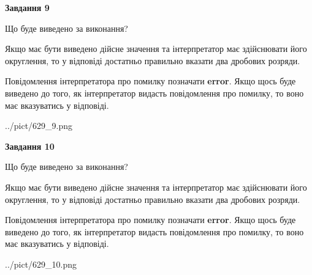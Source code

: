 \documentclass[12pt, ukrainian]{article}
\begin{document}
{\begin {Large}
{\begin {center}\textbf{Завдання 9}\end {center}}\par
Що буде виведено за виконання? \par

Якщо має бути виведено дійсне значення та інтерпретатор має здійснювати його округлення, 
то у відповіді достатньо правильно вказати два дробових розряди.

Повідомлення інтерпретатора про помилку позначати \textbf{error}.
Якщо щось буде виведено до того, як інтерпретатор видасть повідомлення про помилку, 
то воно має вказуватись у відповіді. \par

\begin{center}
	{../pict/629_9.png}
\end{center}
\newpage

{\begin {center}\textbf{Завдання 10}\end {center}}\par
Що буде виведено за виконання? \par

Якщо має бути виведено дійсне значення та інтерпретатор має здійснювати його округлення, 
то у відповіді достатньо правильно вказати два дробових розряди.

Повідомлення інтерпретатора про помилку позначати \textbf{error}.
Якщо щось буде виведено до того, як інтерпретатор видасть повідомлення про помилку, 
то воно має вказуватись у відповіді. \par

\begin{center}
	{../pict/629_10.png}
\end{center}
\newpage

\end {Large}}
\end{document}
